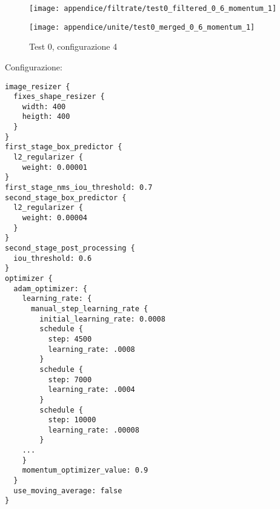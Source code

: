 \newpage
\begin{figure}[H]  
    \begin{minipage}{.5\columnwidth}  
        \centering  
        \texttt{[image: appendice/filtrate/test0\_filtered\_0\_6\_momentum\_1]}  
    \end{minipage}%
    \begin{minipage}{0.5\columnwidth}  
        \centering  
        \texttt{[image: appendice/unite/test0\_merged\_0\_6\_momentum\_1]}  
    \end{minipage}  
    \caption{Test 0, configurazione 4}
\end{figure}%
Configurazione:
\begin{multicols}{2}
    \begin{lstlisting}
image_resizer {
  fixes_shape_resizer {
    width: 400
    heigth: 400
  }
}
first_stage_box_predictor {
  l2_regularizer {
    weight: 0.00001
}
first_stage_nms_iou_threshold: 0.7
second_stage_box_predictor {
  l2_regularizer {
    weight: 0.00004
  }
}
second_stage_post_processing {
  iou_threshold: 0.6
}
optimizer {
  adam_optimizer: {
    learning_rate: {
      manual_step_learning_rate {
        initial_learning_rate: 0.0008
        schedule {
          step: 4500
          learning_rate: .0008
        }
        schedule {
          step: 7000
          learning_rate: .0004
        }
        schedule {
          step: 10000
          learning_rate: .00008
        }
    ...
    }
    momentum_optimizer_value: 0.9
  }
  use_moving_average: false
}
    \end{lstlisting}
\end{multicols}

